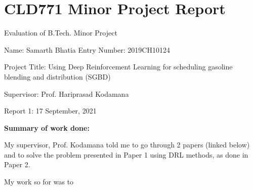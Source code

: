 \documentclass[
]{article}
\author{}
\date{}
\begin{document}
\hypertarget{cld771-minor-project-report}{%
\section{\texorpdfstring{CLD771 Minor Project Report
}{CLD771 Minor Project Report }}\label{cld771-minor-project-report}}

Evaluation of B.Tech. Minor Project

Name: Samarth Bhatia Entry Number: 2019CH10124

Project Title: Using Deep Reinforcement Learning for scheduling gasoline
blending and distribution (SGBD)

Supervisor: Prof. Hariprasad Kodamana

 Report 1: 17 September, 2021

\textbf{Summary of work done:}

My supervisor, Prof. Kodamana told me to go through 2 papers (linked
below) and to solve the problem presented in Paper 1 using DRL methods,
as done in Paper 2.

My work so for was to
\end{document}
